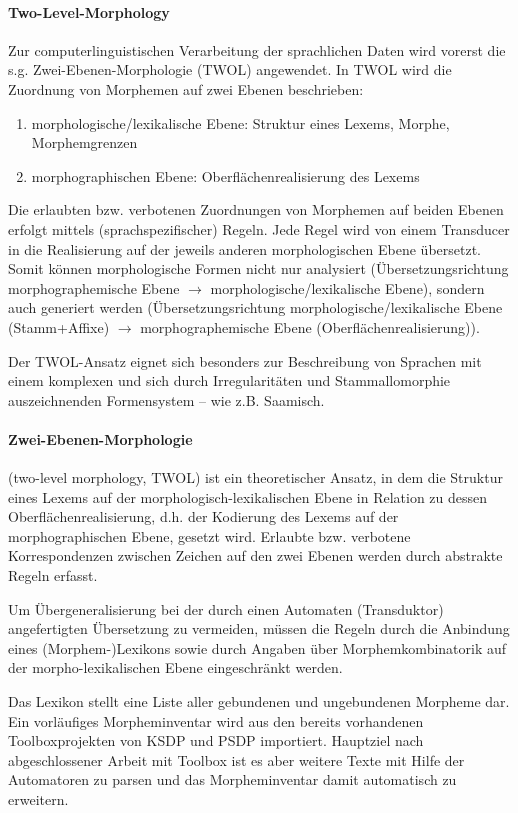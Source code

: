 \documentclass[a4paper,12pt]{article}
\begin{document}
\paragraph{Two-Level-Morphology}
Zur computerlinguistischen Verarbeitung der sprachlichen Daten wird vorerst die s.g. Zwei-Ebenen-Morphologie (TWOL) angewendet. In TWOL wird die Zuordnung von Morphemen auf zwei Ebenen beschrieben:
\begin{enumerate}
\item morphologische/lexikalische Ebene: Struktur eines Lexems, Morphe, Morphemgrenzen
\item morphographischen Ebene: Oberflächenrealisierung des Lexems
\end{enumerate}
Die erlaubten bzw. verbotenen Zuordnungen von Morphemen auf beiden Ebenen erfolgt mittels (sprachspezifischer) Regeln. Jede Regel wird von einem Transducer in die Realisierung auf der jeweils anderen morphologischen Ebene übersetzt. Somit können morphologische Formen nicht nur analysiert (Übersetzungsrichtung morphographemische Ebene $\rightarrow$ morphologische/lexikalische Ebene), sondern auch generiert werden (Übersetzungsrichtung morphologische/lexikalische Ebene (Stamm+Affixe) $\rightarrow$ morphographemische Ebene (Oberflächenrealisierung)).

Der TWOL-Ansatz eignet sich besonders zur Beschreibung von Sprachen mit einem komplexen und sich durch Irregularitäten und Stammallomorphie auszeichnenden Formensystem – wie z.B. Saamisch. 

\paragraph{Zwei-Ebenen-Morphologie} (two-level morphology, TWOL) ist ein theoretischer Ansatz, in dem die Struktur eines Lexems auf der morphologisch-lexikalischen Ebene in Relation zu dessen Oberflächenrealisierung, d.h. der Kodierung des Lexems auf der morphographischen Ebene, gesetzt wird. Erlaubte bzw. verbotene Korrespondenzen zwischen Zeichen auf den zwei Ebenen werden durch abstrakte Regeln erfasst.

Um Übergeneralisierung bei der durch einen Automaten (Transduktor) angefertigten Übersetzung zu vermeiden, müssen die Regeln durch die Anbindung eines (Morphem-)Lexikons sowie durch Angaben über Morphemkombinatorik auf der morpho-lexikalischen Ebene eingeschränkt werden.

Das Lexikon stellt eine Liste aller gebundenen und ungebundenen Morpheme dar. Ein vorläufiges Morpheminventar wird aus den bereits vorhandenen Toolboxprojekten von KSDP und PSDP importiert. Hauptziel nach abgeschlossener Arbeit mit Toolbox ist es aber weitere Texte mit Hilfe der Automatoren zu parsen und das Morpheminventar damit automatisch zu erweitern.
\end{document}
